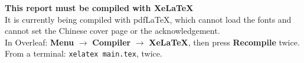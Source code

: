 \documentclass[10pt]{article}
\begin{document}
  \vspace*{3.5cm}
  \begin{center}
    {\Large\bfseries This report must be compiled with XeLaTeX}\\[1.4em]
    It is currently being compiled with pdfLaTeX, which cannot load the fonts and cannot set the
    Chinese cover page or the acknowledgement.\\[1.4em]
    In Overleaf: \textbf{Menu} $\rightarrow$ \textbf{Compiler} $\rightarrow$ \textbf{XeLaTeX},
    then press \textbf{Recompile} twice.\\[1.4em]
    From a terminal: \texttt{xelatex main.tex}, twice.
  \end{center}
  
\end{document}

